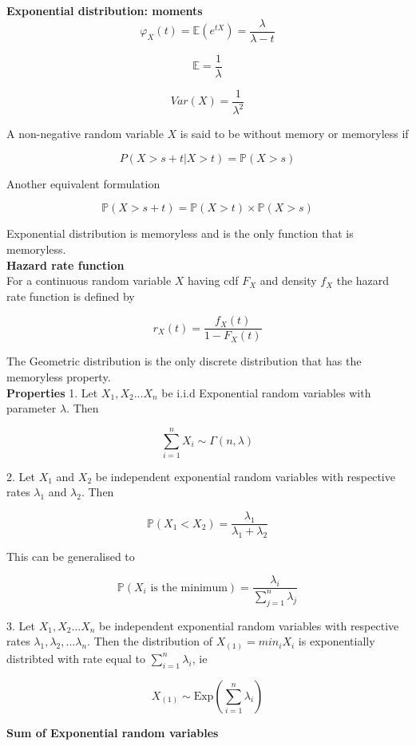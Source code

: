 \textbf{Exponential distribution: moments}\\

$$\varphi_X(t) = \mathbb{E}(e^{tX}) = \frac{\lambda}{\lambda -t} $$

$$\mathbb{E} = \frac{1}{\lambda}$$

$$Var(X) = \frac{1}{\lambda^2}$$

A non-negative random variable $X$ is said to be without memory or memoryless if 

$$P(X >s + t|X > t) = \mathbb{P}(X > s)$$

Another equivalent formulation

$$\mathbb{P}(X > s+t) = \mathbb{P}(X > t) \times \mathbb{P}(X > s)$$

Exponential distribution is memoryless and is the only function that is memoryless.\\

\textbf{Hazard rate function}\\

For a continuous random variable $X$ having cdf $F_X$ and density $f_X$ the hazard rate function is defined by

$$r_X(t) = \frac{f_X(t)}{1 - F_X(t)}$$

The Geometric distribution is the only discrete distribution that has the memoryless property.\\

\textbf{Properties}
1. Let $X_1, X_2...X_n$ be i.i.d Exponential random variables with parameter $\lambda$. Then

$$\sum_{i=1}^n X_i \sim \Gamma(n,\lambda)$$

2. Let $X_1$ and $X_2$ be independent exponential random variables with respective rates $\lambda_1$ and $\lambda_2$. Then

$$\mathbb{P}(X_1 < X_2) = \frac{\lambda_1}{\lambda_1 + \lambda_2}$$

This can be generalised to

$$\mathbb{P}(X_i \text{ is the minimum} ) = \frac{\lambda_i}{\sum_{j=1}^n \lambda_j}$$

3. Let $X_1, X_2...X_n$ be independent exponential random variables with respective rates $\lambda_1, \lambda_2, ... \lambda_n$. Then the distribution of $X_{(1)} = min_i X_i$ is exponentially distribted with rate equal to $\sum_{i=1}^n \lambda_i$, ie

$$X_{(1)} \sim \text{Exp}(\sum_{i=1}^n \lambda_i)$$

\textbf{Sum of Exponential random variables}\\

